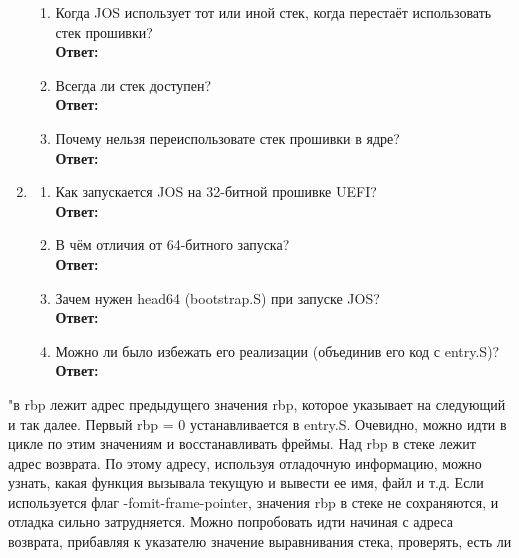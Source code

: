 \documentclass[a4paper,12pt]{article}
\begin{document}
\begin{enumerate}
\begin{enumerate}
		
		\item Когда JOS использует тот или иной стек, когда перестаёт использовать стек прошивки?\\
		\textbf{Ответ:}\\
		
		
		\item Всегда ли стек доступен?\\
		\textbf{Ответ:}\\
		
		
		\item Почему нельзя переиспользовате стек прошивки в ядре?\\
		\textbf{Ответ:}\\
		
		
		\end{enumerate}
	\item \begin{enumerate}
		\item Как запускается JOS на 32-битной прошивке UEFI?\\
		\textbf{Ответ:}\\
		
		
		\item В чём отличия от 64-битного запуска?\\
		\textbf{Ответ:}\\
		
		
		\item Зачем нужен head64 (bootstrap.S) при запуске JOS?\\
		\textbf{Ответ:}\\
		
		
		\item Можно ли было избежать его реализации (объединив его код с entry.S)?\\
		\textbf{Ответ:}\\
		
		
		\end{enumerate}
	\end{enumerate}
"в rbp лежит адрес предыдущего значения rbp, которое указывает на следующий и так далее. 
Первый rbp = 0 устанавливается в entry.S. Очевидно, можно идти в цикле по этим значениям и восстанавливать фреймы.
Над rbp в стеке лежит адрес возврата. По этому адресу, используя отладочную информацию, можно узнать,
какая функция вызывала текущую и вывести ее имя, файл и т.д.
Если используется флаг -fomit-frame-pointer, значения rbp в стеке не сохраняются, и отладка сильно затрудняется.
Можно попробовать идти начиная с адреса возврата, прибавляя к указателю значение выравнивания стека, проверять, есть ли
\end{document}
